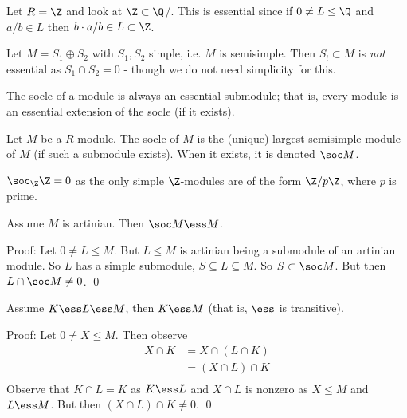 \begin{ex}
Let $R=\Z$ and look at $\Z \subset \Q$/. This is essential since if $0 \neq L \leq \Q$ and $a/b \in L$ then $b\cdot a/b \in L \subset \Z$.
\end{ex}

\begin{ex}
Let $M=S_1 \oplus S_2$ with $S_1,S_2$ simple, i.e. $M$ is semisimple. Then $S_! \subset M$ is \emph{not} essential as $S_1 \cap S_2=0$ - though we do not need simplicity for this.
\end{ex}

\begin{ex}
The socle of a module is always an essential submodule; that is, every module is an essential extension of the socle (if it exists).
\end{ex}

\begin{dfn}
Let $M$ be a $R$-module. The socle of $M$ is the (unique) largest semisimple module of $M$ (if such a submodule exists). When it exists, it is denoted $\soc M$.
\end{dfn}

\begin{ex}
$\soc_\Z \Z=0$ as the only simple $\Z$-modules are of the form $\Z/p\Z$, where $p$ is prime. 
\end{ex}

\begin{prop}
Assume $M$ is artinian. Then $\soc M \ess M$.
\end{prop}

Proof: Let $0 \neq L \leq M$. But $L \leq M$ is artinian being a submodule of an artinian module. So $L$ has a simple submodule, $S \subseteq L \subseteq M$. So $S \subset \soc M$. But then $L \cap \soc M \neq 0$. \qed \\

\begin{prop}
Assume $K \ess L \ess M$, then $K \ess M$ (that is, $\ess$ is transitive).
\end{prop}

Proof: Let $0 \neq X \leq M$. Then observe
\[
\begin{split}
X \cap K&= X \cap (L \cap K) \\
&=(X \cap L) \cap K \\
\end{split}
\]
Observe that $K \cap L=K$ as $K \ess L$ and $X \cap L$ is nonzero as $X \leq M$ and $L \ess M$. But then $(X \cap L) \cap K \neq 0$. \qed \\

